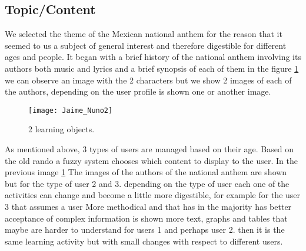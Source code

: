 \subsection{Topic/Content}
We selected the theme of the Mexican national anthem for the reason that it seemed to us a subject of general interest and therefore digestible for different ages and people.
It began with a brief history of the national anthem involving its authors both music and lyrics and a brief synopsis of each of them in the figure \ref{Nuno2} we can observe an image with the 2 characters but we show 2 images of each of the authors, depending on the user profile is shown one or another image.

\begin{figure}[ht!]  
\centering  
\texttt{[image: Jaime\_Nuno2]}
\quad  
\caption{2 learning objects.}  
\label{Nuno2}  
\end{figure}

As mentioned above, 3 types of users are managed based on their age. Based on the old rando a fuzzy system chooses which content to display to the user. In the previous image \ref{Nuno2} The images of the authors of the national anthem are shown but for the type of user 2 and 3. depending on the type of user each one of the activities can change and become a little more digestible, for example for the user 3 that assumes a user More methodical and that has in the majority has better acceptance of complex information is shown more text, graphs and tables that maybe are harder to understand for users 1 and perhaps user 2. then it is the same learning activity but with small changes with respect to different users.
